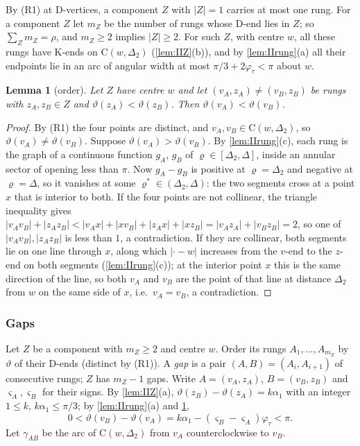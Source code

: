 \documentclass[11pt]{amsart}
\newtheorem{lemma}[theorem]{Lemma}
\theoremstyle{definition}
\theoremstyle{remark}
\newcommand{\Dt}{\Delta_2}
\newcommand{\Cc}{\mathrm{C}}      %
\begin{document}
By (R1) at D-vertices, a component $Z$ with $|Z|=1$ carries at most one rung. For a component $Z$ let $m_Z$ be the number of rungs whose D-end lies in $Z$; so $\sum_Zm_Z=\rho$, and $m_Z\ge2$ implies $|Z|\ge2$. For such $Z$, with centre $w$, all these rungs have K-ends on $\Cc(w,\Dt)$ (\cref{lem:IIZ}(b)), and by \cref{lem:IIrung}(a) all their endpoints lie in an arc of angular width at most $\pi/3+2\varphi_\tau<\pi$ about $w$.

\begin{lemma}[order]\label{lem:IIord}
Let $Z$ have centre $w$ and let $(v_A,z_A)\neq(v_B,z_B)$ be rungs with $z_A,z_B\in Z$ and $\vartheta(z_A)<\vartheta(z_B)$. Then $\vartheta(v_A)<\vartheta(v_B)$.
\end{lemma}
\begin{proof}
By (R1) the four points are distinct, and $v_A,v_B\in\Cc(w,\Dt)$, so $\vartheta(v_A)\neq\vartheta(v_B)$. Suppose $\vartheta(v_A)>\vartheta(v_B)$. By \cref{lem:IIrung}(c), each rung is the graph of a continuous function $g_A$, $g_B$ of $\varrho\in[\Dt,\Delta]$, inside an annular sector of opening less than $\pi$. Now $g_A-g_B$ is positive at $\varrho=\Dt$ and negative at $\varrho=\Delta$, so it vanishes at some $\varrho^*\in(\Dt,\Delta)$: the two segments cross at a point $x$ that is interior to both. If the four points are not collinear, the triangle inequality gives $|v_Av_B|+|z_Az_B|<|v_Ax|+|xv_B|+|z_Ax|+|xz_B|=|v_Az_A|+|v_Bz_B|=2$, so one of $|v_Av_B|,|z_Az_B|$ is less than $1$, a contradiction. If they are collinear, both segments lie on one line through $x$, along which $|\cdot-w|$ increases from the $v$-end to the $z$-end on both segments (\cref{lem:IIrung}(c)); at the interior point $x$ this is the same direction of the line, so both $v_A$ and $v_B$ are the point of that line at distance $\Dt$ from $w$ on the same side of $x$, i.e.\ $v_A=v_B$, a contradiction.
\end{proof}

\subsubsection*{Gaps}
Let $Z$ be a component with $m_Z\ge2$ and centre $w$. Order its rungs $A_1,\dots,A_{m_Z}$ by $\vartheta$ of their D-ends (distinct by (R1)). A \emph{gap} is a pair $(A,B)=(A_i,A_{i+1})$ of consecutive rungs; $Z$ has $m_Z-1$ gaps. Write $A=(v_A,z_A)$, $B=(v_B,z_B)$ and $\varsigma_A,\varsigma_B$ for their signs. By \cref{lem:IIZ}(a), $\vartheta(z_B)-\vartheta(z_A)=k\alpha_1$ with an integer $1\le k$, $k\alpha_1\le\pi/3$; by \cref{lem:IIrung}(a) and \cref{lem:IIord},
\begin{equation}\label{eq:IIgapangle}
0<\vartheta(v_B)-\vartheta(v_A)=k\alpha_1-(\varsigma_B-\varsigma_A)\varphi_\tau<\pi .
\end{equation}
Let $\gamma_{AB}$ be the arc of $\Cc(w,\Dt)$ from $v_A$ counterclockwise to $v_B$.
\end{document}

